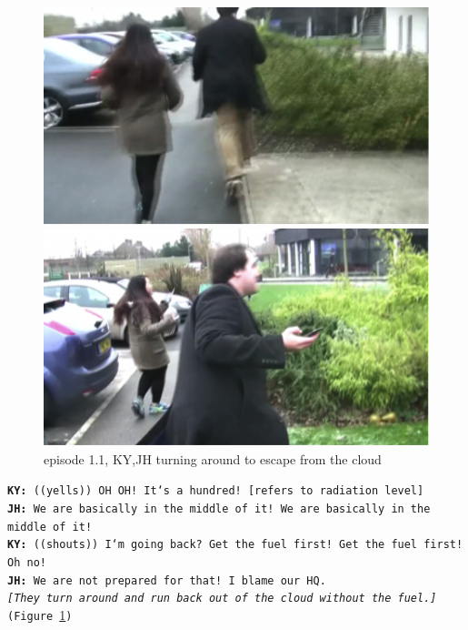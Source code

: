 \begin{figure}[ht]
\centering
\begin{minipage}[b]{0.45\linewidth}
\includegraphics[width=1\textwidth]{img/study1/ep1/ep13}
\caption{episode 1.1, KY,JH running into cloud}
\label{fig:study1ep13}
\end{minipage}
\quad
\begin{minipage}[b]{0.45\linewidth}
 \includegraphics[width=1\textwidth]{img/study1/ep1/ep14}
\caption{episode 1.1, KY,JH turning around to escape from the cloud}
\label{fig:study1ep1-4}
\end{minipage}
\end{figure}

\noindent\texttt{\textbf{KY:} ((yells)) OH OH! It`s a hundred! [refers to radiation level]\\
\textbf{JH:} We are basically in the middle of it! We are basically in the middle of it!\\
\textbf{KY:} ((shouts)) I`m going back? Get the fuel first! Get the fuel first! Oh no! \\
\textbf{JH:} We are not prepared for that! I blame our HQ.\\
\emph{ [They turn around and run back out of the cloud without the fuel.] }(Figure \ref{fig:study1ep1-4})\\
}

